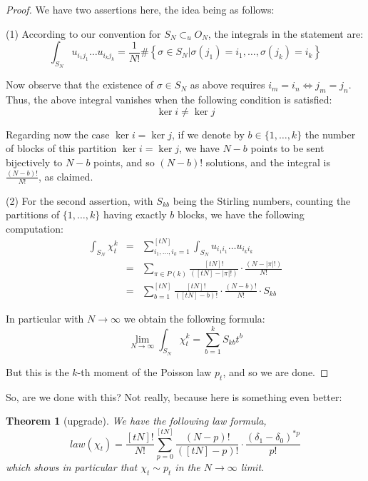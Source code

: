 \documentclass[12pt]{amsbook}
\newtheorem{theorem}{Theorem}[chapter]
\begin{document}
\begin{proof}
We have two assertions here, the idea being as follows:

\medskip

(1) According to our convention for $S_N\subset_uO_N$, the integrals in the statement are:
$$\int_{S_N}u_{i_1j_1}\ldots u_{i_kj_k}=\frac{1}{N!}\#\left\{\sigma\in S_N\Big|\sigma(j_1)=i_1,\ldots,\sigma(j_k)=i_k\right\}$$

Now observe that the existence of $\sigma\in S_N$ as above requires $i_m=i_n\iff j_m=j_n$. Thus, the above integral vanishes when the following condition is satisfied:
$$\ker i\neq\ker j$$

Regarding now the case $\ker i=\ker j$, if we denote by $b\in\{1,\ldots,k\}$ the number of blocks of this partition $\ker i=\ker j$, we have $N-b$ points to be sent bijectively to $N-b$ points, and so $(N-b)!$ solutions, and the integral is $\frac{(N-b)!}{N!}$, as claimed.

\medskip

(2) For the second assertion, with $S_{kb}$ being the Stirling numbers, counting the partitions of $\{1,\ldots,k\}$ having exactly $b$ blocks, we have the following computation:
\begin{eqnarray*}
\int_{S_N}\chi_t^k
&=&\sum_{i_1,\ldots,i_k=1}^{[tN]}\int_{S_N}u_{i_1i_1}\ldots u_{i_ki_k}\\
&=&\sum_{\pi\in P(k)}\frac{[tN]!}{([tN]-|\pi|!)}\cdot\frac{(N-|\pi|!)}{N!}\\
&=&\sum_{b=1}^{[tN]}\frac{[tN]!}{([tN]-b)!}\cdot\frac{(N-b)!}{N!}\cdot S_{kb}
\end{eqnarray*}

In particular with $N\to\infty$ we obtain the following formula:
$$\lim_{N\to\infty}\int_{S_N}\chi_t^k=\sum_{b=1}^kS_{kb}t^b$$

But this is the $k$-th moment of the Poisson law $p_t$, and so we are done.
\end{proof}

So, are we done with this? Not really, because here is something even better:

\begin{theorem}[upgrade]
We have the following law formula,
$$law(\chi_t)=\frac{[tN]!}{N!}\sum_{p=0}^{[tN]}\frac{(N-p)!}{([tN]-p)!}
\cdot\frac{\left(\delta_1-\delta_0\right)^{*p}}{p!}$$ 
which shows in particular that $\chi_t\sim p_t$ in the $N\to\infty$ limit.
\end{theorem}
\end{document}
